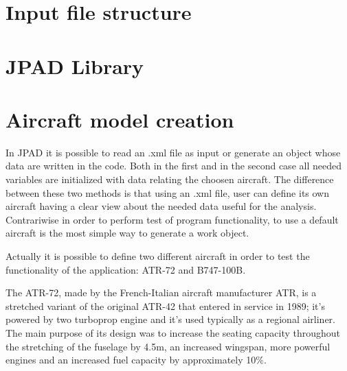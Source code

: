\section{Input file structure}

\section{\gls{JPAD} Library}

\section{Aircraft model creation} \label{par:DefaultAircraft}
In \gls{JPAD} it is possible to read an .xml file as input or generate an object whose data are written in the code. Both in the first and in the second case all needed variables are initialized with data relating the choosen aircraft. The difference between these two methods is that using an .xml file, user can define its own aircraft having a clear view about the needed data useful for the analysis. Contrariwise in order to perform test of program functionality, to use a default aircraft is the most simple way to generate a work object.

\bigskip
\noindent
Actually it is possible to define two different aircraft in order to test the functionality of the application: ATR-72 and B747-100B.
%

\bigskip
\noindent
The ATR-72, made by the French-Italian aircraft manufacturer ATR, is a stretched variant of the original ATR-42 that entered in service in 1989; it’s powered by two turboprop engine and it’s used typically as a regional airliner. The main purpose of its design was to increase the seating capacity throughout the stretching of the fuselage by 4.5m, an increased wingspan, more powerful engines and an increased fuel capacity by approximately 10$\%$.


